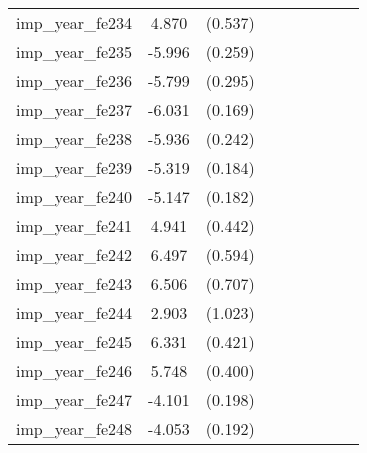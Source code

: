 {\begin{tabular}{l*{4}{cc}}
imp\_year\_fe234&    4.870\sym{***}&  (0.537)&                  &         &                  &         &                  &         \\
imp\_year\_fe235&   -5.996\sym{***}&  (0.259)&                  &         &                  &         &                  &         \\
imp\_year\_fe236&   -5.799\sym{***}&  (0.295)&                  &         &                  &         &                  &         \\
imp\_year\_fe237&   -6.031\sym{***}&  (0.169)&                  &         &                  &         &                  &         \\
imp\_year\_fe238&   -5.936\sym{***}&  (0.242)&                  &         &                  &         &                  &         \\
imp\_year\_fe239&   -5.319\sym{***}&  (0.184)&                  &         &                  &         &                  &         \\
imp\_year\_fe240&   -5.147\sym{***}&  (0.182)&                  &         &                  &         &                  &         \\
imp\_year\_fe241&    4.941\sym{***}&  (0.442)&                  &         &                  &         &                  &         \\
imp\_year\_fe242&    6.497\sym{***}&  (0.594)&                  &         &                  &         &                  &         \\
imp\_year\_fe243&    6.506\sym{***}&  (0.707)&                  &         &                  &         &                  &         \\
imp\_year\_fe244&    2.903\sym{**} &  (1.023)&                  &         &                  &         &                  &         \\
imp\_year\_fe245&    6.331\sym{***}&  (0.421)&                  &         &                  &         &                  &         \\
imp\_year\_fe246&    5.748\sym{***}&  (0.400)&                  &         &                  &         &                  &         \\
imp\_year\_fe247&   -4.101\sym{***}&  (0.198)&                  &         &                  &         &                  &         \\
imp\_year\_fe248&   -4.053\sym{***}&  (0.192)&                  &         &                  &         &                  &         \\

\end{tabular}}
